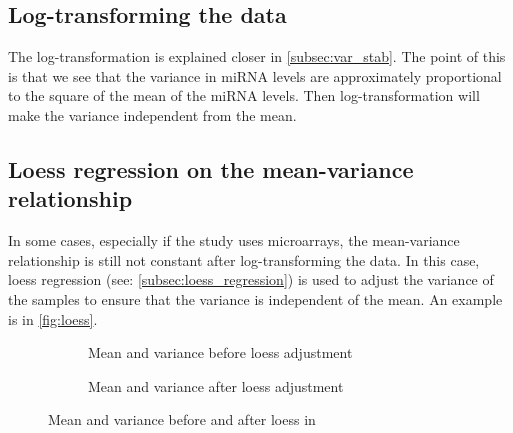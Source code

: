 \subsection{Log-transforming the data}
The log-transformation is explained closer in \autoref{subsec:var_stab}. The point of this is that we see that the variance in miRNA levels are approximately proportional to the square of the mean of the miRNA levels. Then log-transformation will make the variance independent from the mean.

\subsection{Loess regression on the mean-variance relationship}
In some cases, especially if the study uses microarrays, the mean-variance relationship is still not constant after log-transforming the data. In this case, loess regression (see: \autoref{subsec:loess_regression}) is used to adjust the variance of the samples to ensure that the variance is independent of the mean. An example is in \autoref{fig:loess}.

\begin{figure}
    \begin{subfigure}[b]{0.5\textwidth}
    \caption{Mean and variance before loess adjustment}
    \label{fig:loess_before}
    \end{subfigure}
    \begin{subfigure}[b]{0.5\textwidth}
    \caption{Mean and variance after loess adjustment}
    \label{fig:loess_before}
    \end{subfigure}
    \caption{Mean and variance before and after loess in \citet{Asakura2020}}
    \label{fig:loess}
\end{figure}



